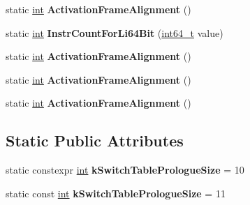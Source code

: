 \begin{DoxyCompactItemize}
\item 
\mbox{\label{classv8_1_1internal_1_1TurboAssembler_aef72dcc951f72f29d67bb7cb34378214}} 
static \mbox{\hyperlink{classint}{int}} {\bfseries Activation\+Frame\+Alignment} ()
\item 
\mbox{\label{classv8_1_1internal_1_1TurboAssembler_a37035b107a3d7f3967051f211c826d4c}} 
static \mbox{\hyperlink{classint}{int}} {\bfseries Instr\+Count\+For\+Li64\+Bit} (\mbox{\hyperlink{classint64__t}{int64\+\_\+t}} value)
\item 
\mbox{\label{classv8_1_1internal_1_1TurboAssembler_aef72dcc951f72f29d67bb7cb34378214}} 
static \mbox{\hyperlink{classint}{int}} {\bfseries Activation\+Frame\+Alignment} ()
\item 
\mbox{\label{classv8_1_1internal_1_1TurboAssembler_aef72dcc951f72f29d67bb7cb34378214}} 
static \mbox{\hyperlink{classint}{int}} {\bfseries Activation\+Frame\+Alignment} ()
\item 
\mbox{\label{classv8_1_1internal_1_1TurboAssembler_aef72dcc951f72f29d67bb7cb34378214}} 
static \mbox{\hyperlink{classint}{int}} {\bfseries Activation\+Frame\+Alignment} ()
\end{DoxyCompactItemize}
\subsection*{Static Public Attributes}
\begin{DoxyCompactItemize}
\item 
\mbox{\label{classv8_1_1internal_1_1TurboAssembler_a5dff2cee8e3ac42c03397e6ce87b88ba}} 
static constexpr \mbox{\hyperlink{classint}{int}} {\bfseries k\+Switch\+Table\+Prologue\+Size} = 10
\item 
\mbox{\label{classv8_1_1internal_1_1TurboAssembler_acd238957eca28f8cf56e3e1baa44e07c}} 
static const \mbox{\hyperlink{classint}{int}} {\bfseries k\+Switch\+Table\+Prologue\+Size} = 11
\end{DoxyCompactItemize}
